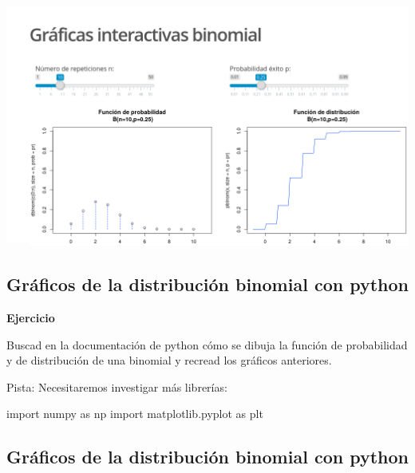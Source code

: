 \documentclass[]{book}
\newenvironment{Shaded}{\begin{snugshade}}{\end{snugshade}}
\newcommand{\ImportTok}[1]{#1}
\newcommand{\NormalTok}[1]{#1}
\begin{document}
\href{https://github.com/joanby/probabilidad}{\includegraphics{Images/noshinyImages/interactiva_bino1.png}}

\hypertarget{gruxe1ficos-de-la-distribuciuxf3n-binomial-con-python}{%
\subsection{Gráficos de la distribución binomial con python}\label{gruxe1ficos-de-la-distribuciuxf3n-binomial-con-python}}

\textbf{Ejercicio}

Buscad en la documentación de python cómo se dibuja la función de probabilidad y de distribución de una binomial y recread los gráficos anteriores.

Pista: Necesitaremos investigar más librerías:

\begin{Shaded}
\begin{Highlighting}[]
\ImportTok{import}\NormalTok{ numpy }\ImportTok{as}\NormalTok{ np}
\ImportTok{import}\NormalTok{ matplotlib.pyplot }\ImportTok{as}\NormalTok{ plt}
\end{Highlighting}
\end{Shaded}

\hypertarget{gruxe1ficos-de-la-distribuciuxf3n-binomial-con-python-1}{%
\subsection{Gráficos de la distribución binomial con python}\label{gruxe1ficos-de-la-distribuciuxf3n-binomial-con-python-1}}
\end{document}
